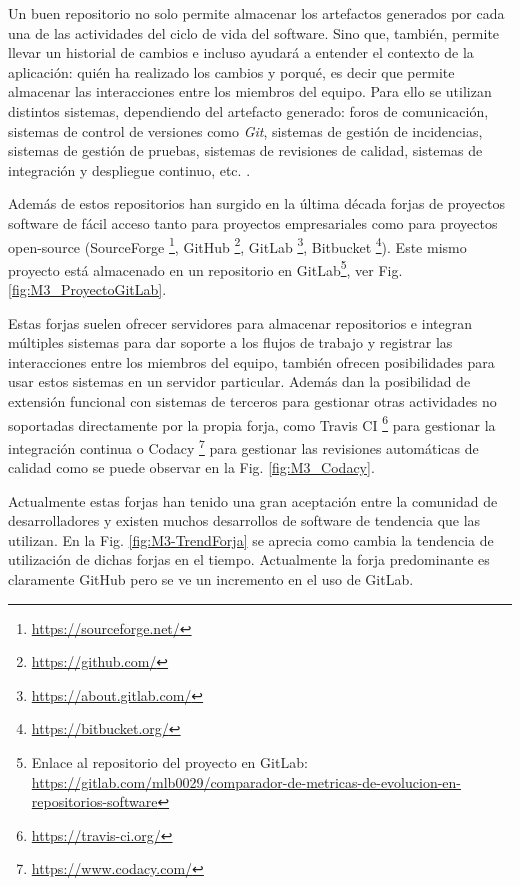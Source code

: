 Un buen repositorio no solo permite almacenar los artefactos generados por cada una de las actividades del ciclo de vida del software. Sino que, también, permite llevar un historial de cambios e incluso ayudará a entender el contexto de la aplicación: quién ha realizado los cambios y porqué, es decir que permite almacenar las interacciones entre los miembros del equipo. Para ello se utilizan distintos sistemas, dependiendo del artefacto generado: foros de comunicación, sistemas de control de versiones como \textit{Git}, sistemas de gestión de incidencias, sistemas de gestión de pruebas, sistemas de revisiones de calidad, sistemas de integración y despliegue continuo, etc. \citep{guemes-pena_emerging_2018}.

Además de estos repositorios han surgido en la última década forjas de proyectos software de fácil acceso tanto para proyectos empresariales como para proyectos open-source (SourceForge \footnote{\url{https://sourceforge.net/}}, GitHub \footnote{\url{https://github.com/}}, GitLab \footnote{\url{https://about.gitlab.com/}}, Bitbucket  \footnote{\url{https://bitbucket.org/}}). Este mismo proyecto está almacenado en un repositorio en GitLab\footnote{Enlace al repositorio del proyecto en GitLab: \url{https://gitlab.com/mlb0029/comparador-de-metricas-de-evolucion-en-repositorios-software}}, ver Fig. \ref{fig:M3_ProyectoGitLab}.


Estas forjas suelen ofrecer servidores para almacenar repositorios e integran múltiples sistemas para dar soporte a los flujos de trabajo y registrar las interacciones entre los miembros del equipo, también ofrecen posibilidades para usar estos sistemas en un servidor particular. Además dan la posibilidad de extensión funcional con sistemas de terceros para gestionar otras actividades no soportadas directamente por la propia forja, como Travis CI \footnote{\url{https://travis-ci.org/}} para gestionar la integración continua o Codacy \footnote{\url{https://www.codacy.com/}} para gestionar las revisiones automáticas de calidad como se puede observar en la Fig. \ref{fig:M3_Codacy}. 


Actualmente estas forjas han tenido una gran aceptación entre la comunidad de desarrolladores y existen muchos desarrollos de software de tendencia que las utilizan. En la Fig. \ref{fig:M3-TrendForja} se aprecia como cambia la tendencia de utilización de dichas forjas en el tiempo. Actualmente la forja predominante es claramente GitHub pero se ve un incremento en el uso de GitLab.

